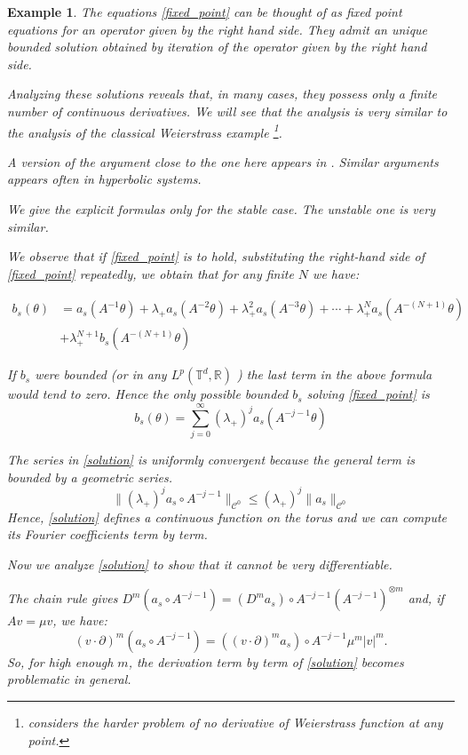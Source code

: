 \documentclass[11pt]{amsart}
\newtheorem{ex}[thm]{Example}
\theoremstyle{definition}
\theoremstyle{remark}
\numberwithin{equation}{section}
\newcommand{\R}{\mathbb R}
\newcommand{\C}{\mathcal{C}}
\def\torus{{\mathbb T}}
\begin{document}
\begin{ex}
  The equations \eqref{fixed_point} can be thought of
  as fixed point equations for an operator given
  by the right hand side.
  They admit an unique  bounded
  solution obtained by iteration of the operator given
  by the right hand side.


 Analyzing these solutions reveals that, in many cases, they possess only a finite number of continuous derivatives.
  We will see that the analysis is very similar
  to the analysis of the classical Weierstrass example
  \footnote{
  \cite{Hardy16} considers the harder problem of no
  derivative of Weierstrass function at any point. }.


  A version of the argument
  close to the one here appears in \cite[Section 6.2]{Llave92}.
Similar arguments appears often in
  hyperbolic systems.

  We give the explicit formulas  only for the stable case. The
  unstable one is very similar.

  We observe that if \eqref{fixed_point} is to
  hold, substituting the right-hand side of \eqref{fixed_point}
  repeatedly, we obtain that for any finite $N$ we have:

  \[
  \begin{split}
  b_s(\theta) &= a_s(A^{-1} \theta)  + \lambda_+ a_s(A^{-2} \theta)
    + \lambda_+^2 a_s(A^{-3} \theta) + \cdots
    + \lambda_+^N a_s( A^{-(N+1)} \theta) \\
    &+ \lambda_+^{N+1} b_s(A^{-(N+1)}\theta)
    \end{split}
    \]

    If $b_s$ were bounded (or in any $L^p(\torus^d, \R)$ )
    the last term in the above formula would tend to zero.
    Hence the only possible bounded $b_s$  solving  \eqref{fixed_point} is
   \begin{equation}\label{solution}
  b_s(\theta)  = \sum_{j = 0}^\infty  (\lambda_+)^j  a_s( A^{-j -1} \theta )
   \end{equation}

   The series in \eqref{solution} is
   uniformly convergent because the general term is
   bounded by a geometric series.
   \[
   \| (\lambda_+)^j  a_s \circ  A^{-j -1}  \|_{\C^0}
   \le   (\lambda_+)^j  \| a_s\|_{\C^0}
   \]
   Hence, \eqref{solution} defines a continuous function on the torus
   and we can compute its Fourier coefficients term by term.


   Now we analyze \eqref{solution} to show that it cannot be very differentiable.

The chain rule gives
$ D^m  (a_s \circ A^{-j-1})  =(D^m  a_s ) \circ  A^{-j -1}  (A^{-j -1} )^{\otimes m }$ and, if $Av = \mu v$, we have:
\[
( v \cdot \partial)^m (a_s \circ A^{-j-1} )
=(  ( v \cdot \partial)^m  a_s ) \circ  A^{-j -1} \mu^m|v|^m.
\]
So, for high enough $m$,
the derivation term by term of
\eqref{solution} becomes problematic in general.


\end{ex}
\end{document}

